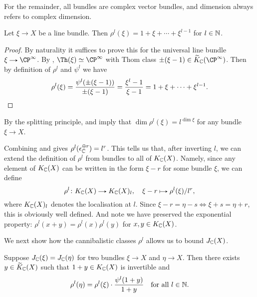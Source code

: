 \begin{convention}
  \label{complex-convention}
  For the remainder, all bundles are complex vector bundles, and
  dimension always refers to complex dimension.
\end{convention}

\begin{lemma}
  \label{cannibal-line}
  Let $\xi \to X$ be a line bundle. Then $\rho^l(\xi) = 1 + \xi +
  \cdots + \xi^{l-1}$ for $l \in \mathbb{N}$.
\end{lemma}

\begin{proof}
  By naturality it suffices to prove this for the universal line
  bundle $\xi \to \CP^{\infty}$. By , $\Th(\xi) \simeq
  \CP^\infty$ with Thom class $\pm(\xi - 1) \in
  \til K_\C(\CP^\infty)$. Then by definition of $\rho^l$ and $\psi^l$
  we have
  \[
  \rho^l(\xi) = \frac{\psi^l(\pm(\xi-1))}{\pm(\xi-1)} = \frac{\xi^l -
    1}{\xi - 1} = 1 + \xi + \cdots + \xi^{l-1}. \qedhere
  \]
\end{proof}

\begin{remark}
  \label{cannibal-dim}
  By the splitting principle,  and
   imply that $\dim \rho^l(\xi) = l^{\dim \xi}$
  for any bundle $\xi \to X$.
\end{remark}

\begin{nothing}
  \label{cannibal-extend}
  Combining  and  gives
  $\rho^l(\epsilon_{\mathbb{C}}^{\oplus r}) = l^r$. This tells us that, after
  inverting $l$, we can extend the definition of $\rho^l$ from bundles
  to all of $K_{\mathbb{C}}(X)$. Namely, since any element of $K_{\mathbb{C}}(X)$ can be
  written in the form $\xi - r$ for some bundle $\xi$, we can define
  \[
  \rho^l \c K_\C(X) \to K_\C(X)_l, \quad \xi - r \mapsto
  \rho^l(\xi)/l^r,
  \]
  where $K_{\mathbb{C}}(X)_l$ denotes the localisation at $l$. Since $\xi - r =
  \eta - s \iff \xi + s = \eta + r$, this is obviously well
  defined. And note we have preserved the exponential property:
  $\rho^l(x+y) = \rho^l(x)\rho^l(y)$ for $x,y \in K_{\mathbb{C}}(X)$.
\end{nothing}

We next show how the cannibalistic classes $\rho^l$ allows us to bound
$J_{\mathbb{C}}(X)$.

\begin{lemma}
  \label{jprime-condition}
  Suppose $J_{\mathbb{C}}(\xi) = J_{\mathbb{C}}(\eta)$ for two bundles $\xi \to X$ and
  $\eta \to X$. Then there exists $y \in \widetilde K_{\mathbb{C}}(X)$ such that $1+y
  \in K_{\mathbb{C}}(X)$ is invertible and
  \[
  \rho^l(\eta) = \rho^l(\xi) \cdot \frac{\psi^l(1+y)}{1+y} \quad
  \text{for all } l \in \mathbb{N}.
  \]
\end{lemma}

